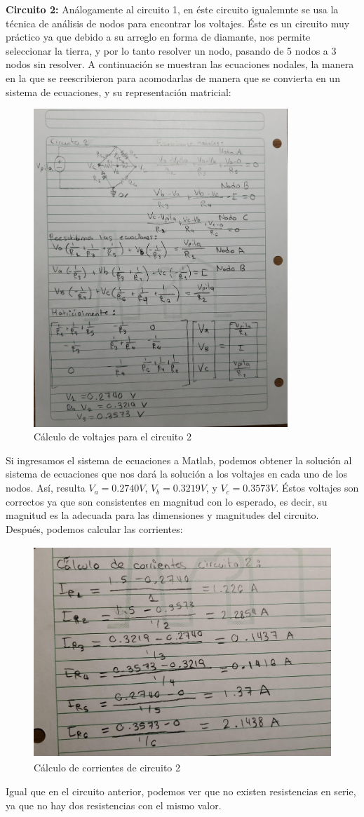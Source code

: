 \documentclass[12pt, letterpaper]{report}
\begin{document}
\textbf{Circuito 2: }
Análogamente al circuito 1, en éste circuito igualemnte se usa la técnica de análisis de nodos para encontrar los voltajes. Éste es un circuito muy práctico ya que 
debido a su arreglo en forma de diamante, nos permite seleccionar la tierra, y por lo tanto resolver un nodo, pasando de 5 nodos a 3 nodos sin resolver. A continuación se muestran las ecuaciones nodales, la manera 
en la que se reescribieron para acomodarlas de manera que se convierta en un sistema de ecuaciones, y su representación matricial: 
\begin{figure}[H]
    \centering
    \includegraphics[height = 12cm]{corrientes 2.jpeg}
    \caption{Cálculo de voltajes para el circuito 2}
\end{figure}Si ingresamos el sistema de ecuaciones a Matlab, podemos obtener la solución al sistema de ecuaciones que nos dará la solución a los voltajes en cada uno de los nodos. Así, resulta $V_a = 0.2740 V$, 
$V_b = 0.3219 V$, y $V_c = 0.3573V$. Éstos voltajes son correctos ya que son consistentes en magnitud con lo esperado, es decir, su magnitud es la adecuada para las dimensiones y magnitudes 
del circuito. Después, podemos calcular las corrientes: 
\begin{figure}[H]
    \centering
    \includegraphics[height = 8cm]{corrientes 3.jpeg}
    \caption{Cálculo de corrientes de circuito 2}
\end{figure}Igual que en el circuito anterior, podemos ver que no existen resistencias en serie, ya que no hay dos resistencias con el mismo valor. 
\end{document}
